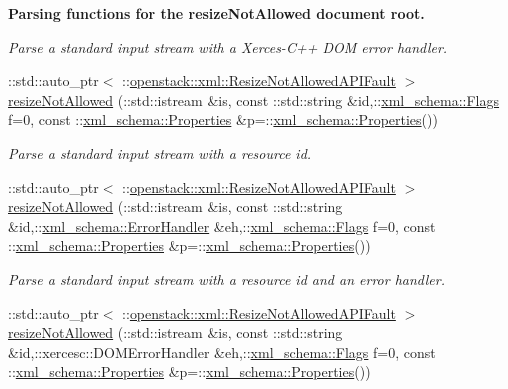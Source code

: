 \begin{Indent}{\bf Parsing functions for the resizeNotAllowed document root.}
\begin{DoxyCompactItemize}
\begin{DoxyCompactList}\small\item\em Parse a standard input stream with a Xerces-\/C++ DOM error handler. \item\end{DoxyCompactList}\item 
::std::auto\_\-ptr$<$ ::\hyperlink{classopenstack_1_1xml_1_1ResizeNotAllowedAPIFault}{openstack::xml::ResizeNotAllowedAPIFault} $>$ \hyperlink{namespaceopenstack_1_1xml_a5c461ffbf6a9aea5c28725025bfef434}{resizeNotAllowed} (::std::istream \&is, const ::std::string \&id,::\hyperlink{namespacexml__schema_affb4c227cbd9aa7453dd1dc5a1401943}{xml\_\-schema::Flags} f=0, const ::\hyperlink{namespacexml__schema_ad27ce19a7ee1d3b1064092648898f64c}{xml\_\-schema::Properties} \&p=::\hyperlink{namespacexml__schema_ad27ce19a7ee1d3b1064092648898f64c}{xml\_\-schema::Properties}())
\begin{DoxyCompactList}\small\item\em Parse a standard input stream with a resource id. \item\end{DoxyCompactList}\item 
::std::auto\_\-ptr$<$ ::\hyperlink{classopenstack_1_1xml_1_1ResizeNotAllowedAPIFault}{openstack::xml::ResizeNotAllowedAPIFault} $>$ \hyperlink{namespaceopenstack_1_1xml_ad27e663d0e37643ba02179f13990621d}{resizeNotAllowed} (::std::istream \&is, const ::std::string \&id,::\hyperlink{namespacexml__schema_ab1c9361bfd3b404eaabf0c31eded79dc}{xml\_\-schema::ErrorHandler} \&eh,::\hyperlink{namespacexml__schema_affb4c227cbd9aa7453dd1dc5a1401943}{xml\_\-schema::Flags} f=0, const ::\hyperlink{namespacexml__schema_ad27ce19a7ee1d3b1064092648898f64c}{xml\_\-schema::Properties} \&p=::\hyperlink{namespacexml__schema_ad27ce19a7ee1d3b1064092648898f64c}{xml\_\-schema::Properties}())
\begin{DoxyCompactList}\small\item\em Parse a standard input stream with a resource id and an error handler. \item\end{DoxyCompactList}\item 
::std::auto\_\-ptr$<$ ::\hyperlink{classopenstack_1_1xml_1_1ResizeNotAllowedAPIFault}{openstack::xml::ResizeNotAllowedAPIFault} $>$ \hyperlink{namespaceopenstack_1_1xml_a6992ace4d945ebebc164f698497836cc}{resizeNotAllowed} (::std::istream \&is, const ::std::string \&id,::xercesc::DOMErrorHandler \&eh,::\hyperlink{namespacexml__schema_affb4c227cbd9aa7453dd1dc5a1401943}{xml\_\-schema::Flags} f=0, const ::\hyperlink{namespacexml__schema_ad27ce19a7ee1d3b1064092648898f64c}{xml\_\-schema::Properties} \&p=::\hyperlink{namespacexml__schema_ad27ce19a7ee1d3b1064092648898f64c}{xml\_\-schema::Properties}())

\end{DoxyCompactItemize}
\end{Indent}

